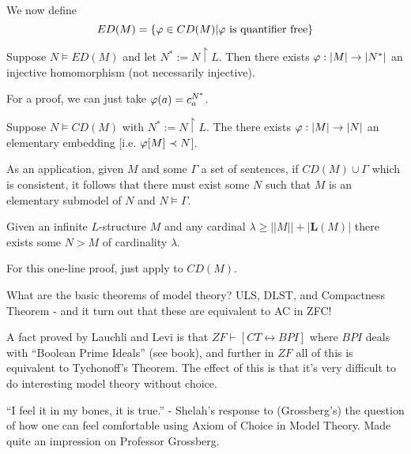  \begin{boxdefinition} 
     We now define $$ED(M)=\{\varphi \in CD(M)|\varphi\text{ is quantifier free}\}$$
 \end{boxdefinition}

 \begin{boxlemma}[Lemma 1]
     Suppose $N\models ED(M)$ and let $N^*:=N\restriction L$. Then there exists $\varphi:|M|\rightarrow |N^*|$ an injective homomorphism (not necessarily injective).
 \end{boxlemma}
 For a proof, we can just take $\varphi(a)=c_a^{N^*}$.

 \begin{boxlemma}[Lemma 2]
     Suppose $N\models CD(M)$ with $N^*:= N\restriction L$. The there exists $\varphi:|M|\rightarrow |N|$ an elementary embedding [i.e. $\varphi[M]\prec N$].
 \end{boxlemma}

 As an application, given $M$ and some $\Gamma$ a set of sentences, if $CD(M)\cup \Gamma$ which is consistent, it follows that there must exist some $N$ such that $M$ is an elementary submodel of $N$ and $N\models \Gamma$.

 \begin{boxtheorem}
     Given an infinite $L$-structure $M$ and any cardinal $\lambda\geq ||M||+|\textbf{L}(M)|$ there exists some $N>M$ of cardinality $\lambda$.
 \end{boxtheorem}
 For this one-line proof, just apply \sorry to $CD(M)$.

 What are the basic theorems of model theory? ULS, DLST, and Compactness Theorem - and it turn out that these are equivalent to AC in ZFC!

\begin{remark}
     A fact proved by Lauchli and Levi is that $ZF\vdash [CT\leftrightarrow BPI]$ where $BPI$ deals with ``Boolean Prime Ideals'' \sorry (see book), and further in $ZF$ all of this is equivalent to Tychonoff's Theorem. The effect of this is that it's very difficult to do interesting model theory without choice.
\end{remark}
\begin{remark}
    ``I feel it in my bones, it is true.'' - Shelah's response to (Grossberg's) the question of how one can feel comfortable using Axiom of Choice in Model Theory. Made quite an impression on Professor Grossberg.
\end{remark}
